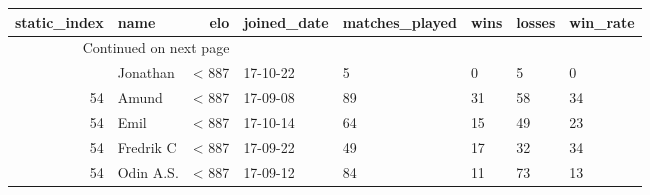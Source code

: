 \begin{longtable}{|r|l|r|l|l|l|l|l|}
\toprule
 static\_index &       name &    elo & joined\_date &  matches\_played &  wins &  losses &  win\_rate \\
\midrule
\endhead
\midrule
\multicolumn{3}{r}{{Continued on next page}} \\
\midrule
\endfoot

\bottomrule
\endlastfoot
           54 &   Jonathan &  < 887 &    17-10-22 &               5 &     0 &       5 &         0 \\
           54 &      Amund &  < 887 &    17-09-08 &              89 &    31 &      58 &        34 \\
           54 &       Emil &  < 887 &    17-10-14 &              64 &    15 &      49 &        23 \\
           54 &  Fredrik C &  < 887 &    17-09-22 &              49 &    17 &      32 &        34 \\
           54 &  Odin A.S. &  < 887 &    17-09-12 &              84 &    11 &      73 &        13 \\
\end{longtable}
